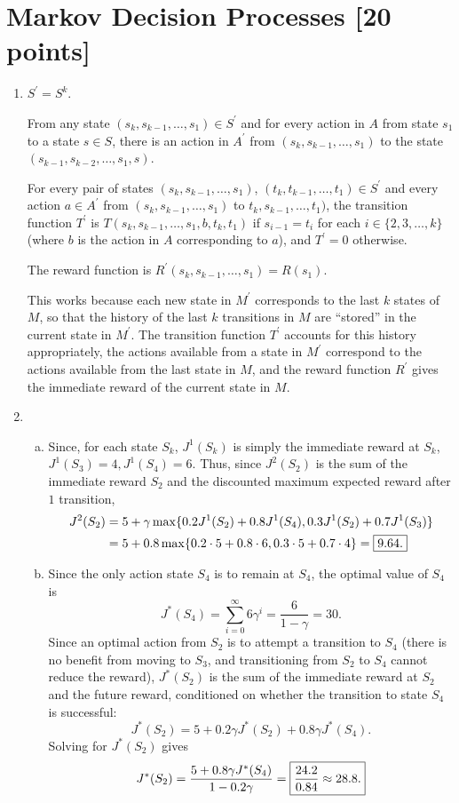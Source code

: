 \documentclass[11pt]{article}
\begin{document}
\section{Markov Decision Processes [20 points]}
\begin{enumerate}[1.]
\item $S^{\prime} = S^k$.

From any state
$(s_k,s_{k-1},\ldots,s_1) \in S^{\prime}$ and for every action in $A$ from
state $s_1$ to a state $s \in S$, there is an action in $A^{\prime}$ from
$(s_k,s_{k-1},\ldots,s_1)$ to the state $(s_{k-1},s_{k-2},\ldots,s_1,s)$.

For every pair of states
$(s_k,s_{k-1},\ldots,s_1)$, $(t_k,t_{k-1},\ldots,t_1) \in S^{\prime}$ and
every action $a \in A^{\prime}$ from $(s_k,s_{k-1},\ldots,s_1)$ to 
$t_k,s_{k-1},\ldots,t_1)$, the transition function $T^{\prime}$ is
$T(s_k,s_{k-1},\ldots,s_1,b,t_k,t_1)$ if $s_{i-1} = t_i$ for
each $i \in \{2,3,\ldots,k\}$ (where $b$ is the action in $A$ corresponding
to $a$), and $T^{\prime} = 0$ otherwise.

The reward function is $R^{\prime}(s_k,s_{k-1},\ldots,s_1) = R(s_1)$. 

This works because each new state in $M^{\prime}$ corresponds to the last
$k$ states of $M$, so that the history of the last $k$ transitions in $M$ are
``stored'' in the current state in $M^{\prime}$. The transition function
$T^{\prime}$ accounts for this history appropriately, the actions available
from a state in $M^{\prime}$ correspond to the actions available from the last
state in $M$, and the reward function $R^{\prime}$ gives the immediate reward
of the current state in $M$.

\item
\begin{enumerate}[a.]
\item Since, for each state $S_k$, $J^1(S_k)$ is simply the immediate reward
at $S_k$,  $J^1(S_3) = 4, J^1(S_4) = 6$. Thus, since
$J^2(S_2)$ is the sum of the immediate reward $S_2$ and the discounted maximum
expected reward after $1$ transition,
\begin{align*}
J^2(S_2)
 & = 5 + \gamma\max\{0.2J^1(S_2) + 0.8J^1(S_4), 0.3J^1(S_2) + 0.7J^1(S_3)\} \\
 & = 5 + 0.8\max\{0.2\cdot5 + 0.8\cdot6, 0.3\cdot5 + 0.7\cdot4\}
   = \mbox{\fbox{$9.64$.}}
\end{align*}

\item Since the only action state $S_4$ is to remain at $S_4$, the optimal
value of $S_4$ is
\[J^*(S_4)
 = \sum_{i = 0}^{\infty} 6 \gamma^i
 = \frac{6}{1 - \gamma}
 = 30.
\]
Since an optimal action from $S_2$ is to attempt a transition to $S_4$ (there
is no benefit from moving to $S_3$, and transitioning from $S_2$ to $S_4$
cannot reduce the reward), $J^*(S_2)$ is the sum of the immediate reward at
$S_2$ and the future reward, conditioned on whether the transition to state
$S_4$ is successful:
\[J^*(S_2)
 = 5 + 0.2\gamma J^*(S_2) + 0.8\gamma J^*(S_4).\]
Solving for $J^*(S_2)$ gives
\[J^*(S_2)
 = \frac{5 + 0.8\gamma J^*(S_4)}{1 - 0.2\gamma}
 = \mbox{\fbox{$\displaystyle \frac{24.2}{0.84}
 \approx 28.8$.}}
\]

\end{enumerate}
\end{enumerate}
\end{document}
